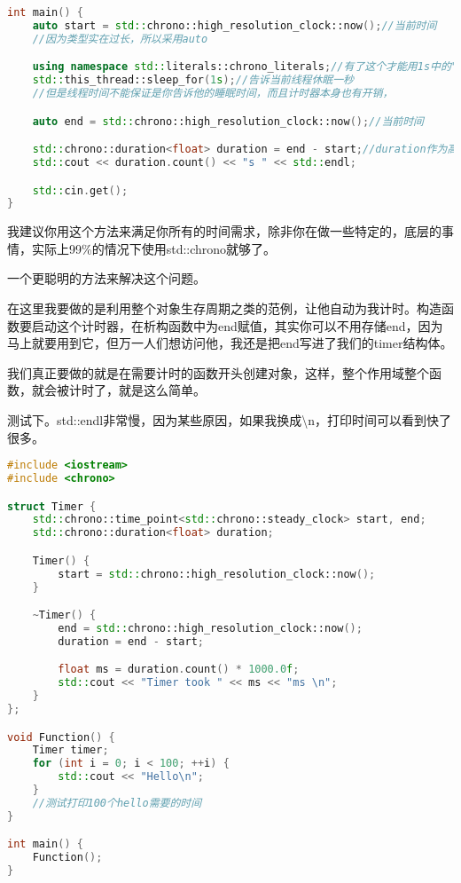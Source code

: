 \begin{lstlisting}[language=c++]
int main() {
    auto start = std::chrono::high_resolution_clock::now();//当前时间
    //因为类型实在过长，所以采用auto

    using namespace std::literals::chrono_literals;//有了这个才能用1s中的"s"
    std::this_thread::sleep_for(1s);//告诉当前线程休眠一秒
    //但是线程时间不能保证是你告诉他的睡眠时间，而且计时器本身也有开销，

    auto end = std::chrono::high_resolution_clock::now();//当前时间

    std::chrono::duration<float> duration = end - start;//duration作为高精度计时，翻译为持续时间，这里其实也可以用auto
    std::cout << duration.count() << "s " << std::endl;

    std::cin.get();
}
\end{lstlisting}

我建议你用这个方法来满足你所有的时间需求，除非你在做一些特定的，底层的事情，实际上99\%的情况下使用{\ncodestyle std::chrono}就够了。

一个更聪明的方法来解决这个问题。

在这里我要做的是利用整个对象生存周期之类的范例，让他自动为我计时。构造函数要启动这个计时器，在析构函数中为end赋值，其实你可以不用存储end，因为马上就要用到它，但万一人们想访问他，我还是把end写进了我们的timer结构体。

我们真正要做的就是在需要计时的函数开头创建对象，这样，整个作用域整个函数，就会被计时了，就是这么简单。

测试下。{\ncodestyle std::endl}非常慢，因为某些原因，如果我换成\textbackslash n，打印时间可以看到快了很多。

\begin{lstlisting}[language=c++]
#include <iostream>
#include <chrono>

struct Timer {
    std::chrono::time_point<std::chrono::steady_clock> start, end;
    std::chrono::duration<float> duration;

    Timer() {
        start = std::chrono::high_resolution_clock::now();
    }

    ~Timer() {
        end = std::chrono::high_resolution_clock::now();
        duration = end - start;

        float ms = duration.count() * 1000.0f;
        std::cout << "Timer took " << ms << "ms \n";
    }
};

void Function() {
    Timer timer;
    for (int i = 0; i < 100; ++i) {
        std::cout << "Hello\n";
    }
    //测试打印100个hello需要的时间
}

int main() {
    Function();
}
\end{lstlisting}

